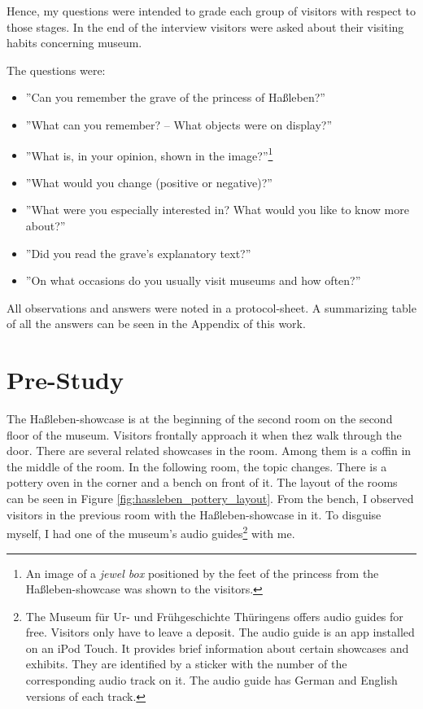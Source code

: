 Hence, my questions were intended to grade each group of visitors with respect to those stages. In the end of the interview visitors were asked about their visiting habits concerning museum. 

The questions were:
\begin{itemize}
	\item ''Can you remember the grave of the princess of Haßleben?''
	\item ''What can you remember? -- What objects were on display?''
	\item ''What is, in your opinion, shown in the image?''\footnote{An image of a \textit{jewel box} positioned by the feet of the princess from the Haßleben-showcase was shown to the visitors.}
	\item ''What would you change (positive or negative)?''
	\item ''What were you especially interested in? What would you like to know more about?''
	\item ''Did you read the grave's explanatory text?''
	\item ''On what occasions do you usually visit museums and how often?''
\end{itemize}
All observations and answers were noted in a protocol-sheet. A summarizing table of all the answers can be seen in the Appendix of this work. 


\section{Pre-Study}
\label{evaluation_pre}

The Haßleben-showcase is at the beginning of the second room on the second floor of the museum. Visitors frontally approach it when thez walk through the door. There are several related showcases in the room. Among them is a coffin in the middle of the room. In the following room, the topic changes. There is a pottery oven in the corner and a bench on front of it. The layout of the rooms can be seen in Figure \ref{fig:hassleben_pottery_layout}. From the bench, I observed visitors in the previous room with the Haßleben-showcase in it. To disguise myself, I had one of the museum's audio guides\footnote{The Museum für Ur- und Frühgeschichte Thüringens offers audio guides for free. Visitors only have to leave a deposit. The audio guide is an app installed on an iPod Touch. It provides brief information about certain showcases and exhibits. They are identified by a sticker with the number of the corresponding audio track on it. The audio guide has German and English versions of each track.} with me.  

